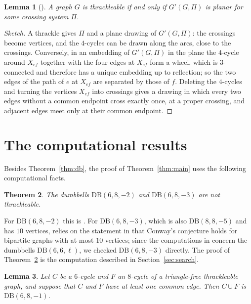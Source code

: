 \documentclass[11pt]{amsart}
\newtheorem{theorem}{Theorem}[section]
\newtheorem{lemma}[theorem]{Lemma}
\theoremstyle{definition}
\theoremstyle{remark}
\numberwithin{equation}{section}
\newcommand{\DB}{\mathrm{DB}}
\begin{document}
\begin{lemma}[{\cite[Section~4]{FP11}}]\label{lem:fp}
A graph $G$ is thrackleable if and only if $G'(G,\Pi)$ is planar for some crossing system $\Pi$.
\end{lemma}

\begin{proof}[Sketch]
A thrackle gives $\Pi$ and a plane drawing of $G'(G,\Pi)$: the crossings become vertices, and the $4$-cycles can be drawn along the arcs, close to the crossings. Conversely, in an embedding of $G'(G,\Pi)$ in the plane the $4$-cycle around $X_{ef}$ together with the four edges at $X_{ef}$ form a wheel, which is $3$-connected and therefore has a unique embedding up to reflection; so the two edges of the path of $e$ at $X_{ef}$ are separated by those of $f$. Deleting the $4$-cycles and turning the vertices $X_{ef}$ into crossings gives a drawing in which every two edges without a common endpoint cross exactly once, at a proper crossing, and adjacent edges meet only at their common endpoint.
\end{proof}

\section{The computational results}\label{sec:comp}

Besides Theorem~\ref{thm:db}, the proof of Theorem~\ref{thm:main} uses the following computational facts.

\begin{theorem}\label{thm:dbs}
The dumbbells $\DB(6,8,-2)$ and $\DB(6,8,-3)$ are not thrackleable.
\end{theorem}

For $\DB(6,8,-2)$ this is \cite[Lemma~4.2]{Sco26}. For $\DB(6,8,-3)$, which is also $\DB(8,8,-5)$ and has $10$ vertices, \cite[Lemma~3.13]{Sco26} relies on the statement in \cite{FP11} that Conway's conjecture holds for bipartite graphs with at most $10$ vertices; since the computations in \cite[Section~4]{FP11} concern the dumbbells $\DB(6,6,\ell)$, we checked $\DB(6,8,-3)$ directly. The proof of Theorem~\ref{thm:dbs} is the computation described in Section~\ref{sec:search}.

\begin{lemma}\label{lem:overlap}
Let $C$ be a $6$-cycle and $F$ an $8$-cycle of a triangle-free thrackleable graph, and suppose that $C$ and $F$ have at least one common edge. Then $C\cup F$ is $\DB(6,8,-1)$.
\end{lemma}
\end{document}
